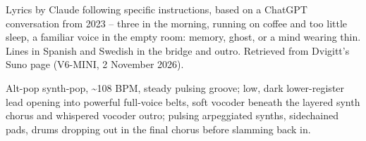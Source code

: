 
\label{sec:static-lullaby}
\begin{notes}
Lyrics by Claude following specific instructions, based on a ChatGPT conversation from 2023 -- three in the morning, running on coffee and too little sleep, a familiar voice in the empty room: memory, ghost, or a mind wearing thin. Lines in Spanish and Swedish in the bridge and outro. Retrieved from Dvigitt's Suno page (V6-MINI, 2 November 2026).
\end{notes}
\begin{style}
Alt-pop synth-pop, \textasciitilde{}108 BPM, steady pulsing groove; low, dark lower-register lead opening into powerful full-voice belts, soft vocoder beneath the layered synth chorus and whispered vocoder outro; pulsing arpeggiated synths, sidechained pads, drums dropping out in the final chorus before slamming back in.
\end{style}
